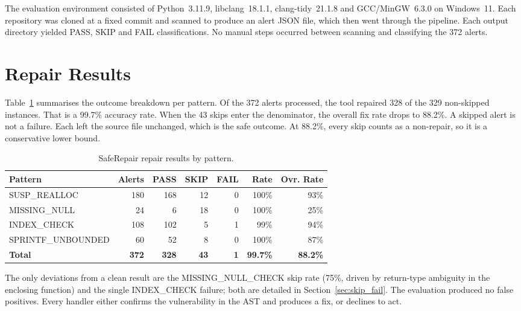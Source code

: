 The evaluation environment consisted of Python~3.11.9, libclang~18.1.1, clang-tidy~21.1.8 and GCC/MinGW~6.3.0 on Windows~11. Each repository was cloned at a fixed commit and scanned to produce an alert JSON file, which then went through the pipeline. Each output directory yielded PASS, SKIP and FAIL classifications. No manual steps occurred between scanning and classifying the 372 alerts.

\section{Repair Results}
\label{sec:repair_results}

Table~\ref{tab:results} summarises the outcome breakdown per pattern. Of the 372 alerts processed, the tool repaired 328 of the 329 non-skipped instances. That is a 99.7\% accuracy rate. When the 43 skips enter the denominator, the overall fix rate drops to 88.2\%. A skipped alert is not a failure. Each left the source file unchanged, which is the safe outcome. At 88.2\%, every skip counts as a non-repair, so it is a conservative lower bound.

{%
\renewcommand{\arraystretch}{1.3}
\begin{table}[ht]
\caption{SafeRepair repair results by pattern.}
\label{tab:results}
\centering
\begin{tabular}{|l|r|r|r|r|r|r|}
\hline
\textbf{Pattern}         & \textbf{Alerts} & \textbf{PASS} & \textbf{SKIP} & \textbf{FAIL} & \textbf{Rate} & \textbf{Ovr. Rate} \\
\hline
SUSP\_REALLOC            & 180 & 168 & 12 & 0 & 100\% &  93\% \\
MISSING\_NULL            &  24 &   6 & 18 & 0 & 100\% &  25\% \\
INDEX\_CHECK             & 108 & 102 &  5 & 1 &  99\% &  94\% \\
SPRINTF\_UNBOUNDED       &  60 &  52 &  8 & 0 & 100\% &  87\% \\
\hline
\textbf{Total}           & \textbf{372} & \textbf{328} & \textbf{43} & \textbf{1} & \textbf{99.7\%} & \textbf{88.2\%} \\
\hline
\end{tabular}
\end{table}
}

The only deviations from a clean result are the MISSING\_NULL\_CHECK skip rate (75\%, driven by return-type ambiguity in the enclosing function) and the single INDEX\_CHECK failure; both are detailed in Section~\ref{sec:skip_fail}. The evaluation produced no false positives. Every handler either confirms the vulnerability in the AST and produces a fix, or declines to act.

